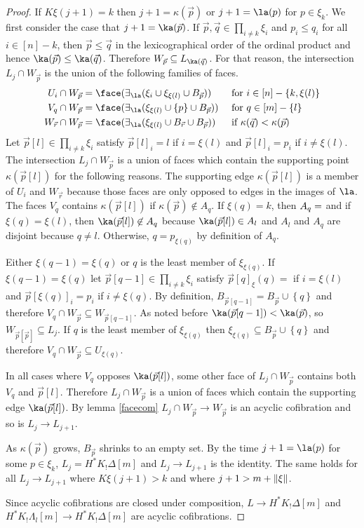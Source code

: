 \documentclass{amsart}
\theoremstyle{plain}
\theoremstyle{definition}
\newcommand\set[1]{\left\{#1\right\}}
\begin{document}
\begin{proof}
If $K\xi(j+1) = k$ then $j+1=\kappa(\vec p)$ or $j+1 = \la(p)$ for $p\in \xi_k$. We first consider the case that $j+1=\ka(\vec p)$. If $\vec p,\vec q\in \prod_{i\neq k} \xi_i$ and $p_i\leq q_i$ for all $i\in [n]-k$, then $\vec p \leq \vec q$ in the lexicographical order of the ordinal product and hence $\ka(\vec p)\leq \ka(\vec q)$. Therefore $W_{\vec p}\subseteq L_{\ka(\vec q)}$. For that reason, the intersection $L_j\cap W_{\vec p}$ is the union of the following families of faces.
\begin{align*}
U_i\cap W_{\vec p} &= \face(\im\la(\xi_i\cup\xi_{\xi(l)}\cup B_{\vec p})) &&\textrm{ for $i\in [n]-\set{k,\xi(l)}$}\\
V_q\cap W_{\vec p} &= \face(\im\la(\xi_{\xi(l)}\cup\set p\cup B_{\vec p})) &&\textrm{ for $q\in [m]-\set l$}\\
W_{\vec r}\cap W_{\vec p} &= \face(\im\la(\xi_{\xi(l)}\cup B_{\vec r}\cup B_{\vec p}))&&\textrm{ if $\kappa(\vec q)<\kappa(\vec p)$ }
\end{align*}
Let $\vec p[l]\in \prod_{i\neq k} \xi_i$ satisfy $\vec p[l]_i = l$ if $i=\xi(l)$ and $\vec p[l]_i = p_i$ if $i\neq \xi(l)$. The intersection $L_j\cap W_{\vec p}$ is a union of faces which contain the supporting point $\kappa(\vec p[l])$ for the following reasons. The supporting edge $\kappa(\vec p[l])$ is a member of $U_i$ and $W_{\vec r}$ because those faces are only opposed to edges in the images of $\la$. The faces $V_q$ contains $\kappa(\vec p[l])$ if $\kappa(\vec p)\not\in A_q$. If $\xi(q) = k$, then $A_q=\empty$ and if $\xi(q) = \xi(l)$, then $\ka(\vec p[l])\not\in A_q$ because $\ka(\vec p[l])\in A_l$ and $A_l$ and $A_q$ are disjoint because $q\neq l$. Otherwise, $q = p_{\xi(q)}$ by definition of $A_q$. 

Either $\xi(q-1) = \xi(q)$ or $q$ is the least member of $\xi_{\xi(q)}$. If $\xi(q-1)=\xi(q)$ let $\vec p[q-1] \in \prod_{i\neq k} \xi_i$ satisfy $\vec p[q]_\xi(q) = $ if $i=\xi(l)$ and $\vec p[\xi(q)]_i = p_i$ if $i\neq \xi(q)$. By definition, $B_{\vec p[q-1]} = B_{\vec p} \cup \set q$ and therefore $V_q\cap W_{\vec p}\subseteq W_{\vec p[q-1]}$. As noted before $\ka(\vec p[q-1])<\ka(\vec p)$, so $W_{\vec p[\vec p]}\subseteq L_{j}$. If $q$ is the least member of $\xi_{\xi(q)}$ then $\xi_{\xi(q)}\subseteq B_{\vec p} \cup \set q$ and therefore $V_q\cap W_{\vec p}\subseteq U_{\xi(q)}$. 

In all cases where $V_q$ opposes $\ka(\vec p[l])$, some other face of $L_j\cap W_{\vec p}$ contains both $V_q$ and $\vec p[l]$. Therefore $L_j\cap W_{\vec p}$ is a union of faces which contain the supporting edge $\ka(\vec p[l])$. By lemma \ref{facecom} $L_j\cap W_{\vec p}\to W_{\vec p}$ is an acyclic cofibration and so is $L_j\to L_{j+1}$.

As $\kappa(\vec p)$ grows, $B_{\vec p}$ shrinks to an empty set. By the time $j+1 = \la(p)$ for some $p\in \xi_k$, $L_j = H^*K_!\Delta[m]$ and $L_j\to L_{j+1}$ is the identity. The same holds for all $L_j\to L_{j+1}$ where $K\xi(j+1)>k$ and where $j+1>m+\left\Vert\xi\right\Vert$.

Since acyclic cofibrations are closed under composition, $L\to H^*K_!\Delta[m]$ and $H^*K_!\Lambda_l[m] \to H^*K_!\Delta[m]$ are acyclic cofibrations.
\end{proof}
\end{document}
